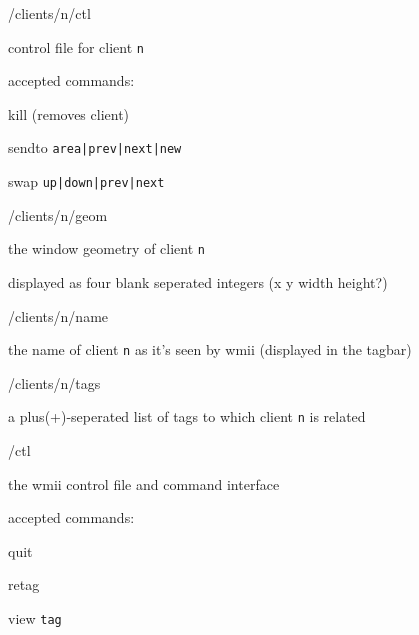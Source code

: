 \documentclass[12pt,a4paper]{article} %
\newenvironment{itemize*}
  {\begin{itemize}
      \setlength{\itemsep}{0pt}
      \setlength{\parskip}{0pt}}
  {\end{itemize}}
\begin{document}
\begin{description}
\begin{itemize*}
\item [/clients/n/ctl]
\begin{itemize*}
\item control file for client \verb+n+
\item accepted commands:
\begin{itemize*}
\item kill (removes client)
\item sendto \verb+area|prev|next|new+
\item swap \verb+up|down|prev|next+
\end{itemize*}
\end{itemize*}

\item [/clients/n/geom]
\begin{itemize*}
\item the window geometry of client \verb+n+
\item displayed as four blank seperated integers (x y width height?) 
\end{itemize*}

\item [/clients/n/name]
\begin{itemize*}
\item the name of client \verb+n+ as it's seen by wmii (displayed in the tagbar)
\end{itemize*}

\item [/clients/n/tags]
\begin{itemize*}
\item a plus(+)-seperated list of tags to which client \verb+n+ is related 
\end{itemize*}

\item [/ctl]
\begin{itemize*}
\item the wmii control file and command interface
\item accepted commands:
\begin{itemize*}
\item quit
\item retag
\item view \verb+tag+
\end{itemize*}
\end{itemize*}


\end{itemize*}
\end{description}
\end{document}
